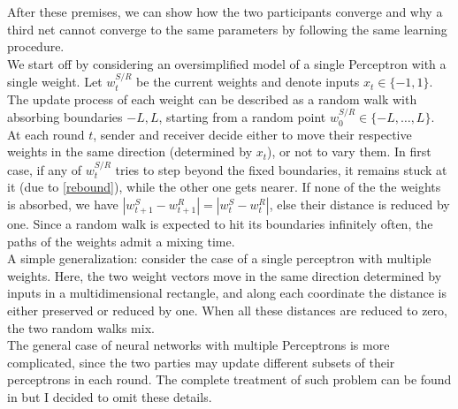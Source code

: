 \documentclass[%
    corpo=11pt,
    twoside,
    stile=classica,
    oldstyle,
    autoretitolo,
    tipotesi=magistrale,
    greek,
    evenboxes,
    english
]{toptesi}
\begin{document}
After these premises, we can show how the two participants converge and why a third net cannot converge to the same parameters by following the same learning procedure. \\
 We start off by considering an oversimplified model of a single Perceptron with a single weight. \iftrue Let $w^{S/R}_{t}$  be the current weights and denote inputs $x_{t} \in \{-1,1\} $. \fi The update process of each weight can be described as a random walk with absorbing boundaries $-L,L$, starting from a random point $w^{S/R}_{0}\in\{-L,\dots ,L\}$. \\
At each round $t$, sender and receiver decide either to move their respective weights in the same direction (determined by $x_t$), or not to vary them. In first case, if any of $w^{S/R}_t$ tries to step beyond the fixed boundaries, it remains stuck at it (due to \eqref{rebound}), while the other one gets nearer.  If none of the the weights is absorbed, we have $|w_{t+1}^S - w_{t+1}^R| = |w_{t}^S - w_{t}^R|$, else their distance is reduced by one. Since a random walk is expected to hit its boundaries infinitely often, the paths of the weights admit a mixing time. \\
A simple generalization: consider the case of a single perceptron with multiple weights. Here, the two weight vectors move in the same direction determined by inputs in a multidimensional rectangle, and along each coordinate the distance is either preserved or reduced by one. When all these distances are reduced to zero, the two random walks mix. \\
The general case of neural networks with multiple Perceptrons is more complicated, since the two parties may update different subsets of their perceptrons in each round. The complete treatment of such problem can be found in \cite{shamir} but I decided to omit these details.
\end{document}
